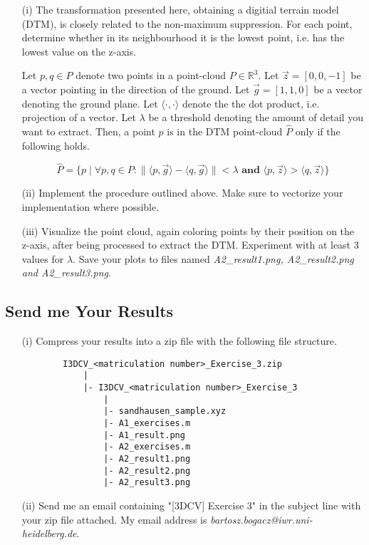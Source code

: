 \documentclass[fontsize=13pt,a4paper]{article}
\begin{document}
\begin{itemize}
    \item[(i)] The transformation presented here, obtaining a
        digitial terrain model (DTM), is closely related to the
        non-maximum suppression. For each point, determine whether
        in its neighbourhood it is the lowest point, i.e. has the lowest
        value on the z-axis.

        Let $p, q \in P$ denote two points in a point-cloud $P \in \mathbb{R}^3$.
        Let $\vec{z} = [0, 0, -1]$ be a vector pointing in the direction
        of the ground. Let $\vec{g} = [1, 1, 0]$ be a vector denoting the
        ground plane. Let $\langle \cdot, \cdot \rangle$ denote the
        the dot product, i.e. projection of a vector.
        Let $\lambda$ be a threshold denoting the
        amount of detail you want to extract.
        Then, a point $p$ is in the DTM point-cloud $\hat{P}$ only if the
        following holds.

        \begin{equation}
\hat{P} = \{p \; | \; \forall p, q \in P:
    \|\langle p, \vec{g} \rangle -
        \langle q, \vec{g} \rangle\| < \lambda \textbf{ and }
                    \langle p, \vec{z} \rangle > \langle q, \vec{z} \rangle \}
        \end{equation}

    \item[(ii)] Implement the procedure outlined above. Make sure
        to vectorize your implementation where possible.

    \item[(iii)] Visualize the point cloud, again coloring points by
        their position on the z-axis, after being processed to extract
        the DTM. Experiment with at least 3 values for $\lambda$.
        Save your plots to files named
        \emph{A2\_result1.png, A2\_result2.png and A2\_result3.png}.
\end{itemize}

\newpage

\subsection{Send me Your Results}

\begin{itemize}
    \item [(i)] Compress your results into a zip file
    with the following file structure.

    \begin{verbatim}
        I3DCV_<matriculation number>_Exercise_3.zip
            |
            |- I3DCV_<matriculation number>_Exercise_3
                |
                |- sandhausen_sample.xyz
                |- A1_exercises.m
                |- A1_result.png
                |- A2_exercises.m
                |- A2_result1.png
                |- A2_result2.png
                |- A2_result3.png
    \end{verbatim}

    \item [(ii)] Send me an email containing "[3DCV] Exercise 3"
    in the subject line with your zip file attached. My email address
    is \emph{bartosz.bogacz@iwr.uni-heidelberg.de}.
\end{itemize}
\end{document}
